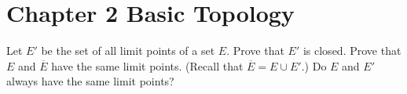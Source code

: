 \documentclass[12pt]{article}
\newenvironment{problem}[2][Exercise]{\begin{trivlist}
\item[\hskip \labelsep {\bfseries #1}\hskip \labelsep {\bfseries #2.}]}{\end{trivlist}}
\begin{document}

\rhead{\today}



\section*{Chapter 2 Basic Topology}


\begin{problem}{2.6}
Let $E'$ be the set of all limit points of a set $E$. Prove that $E'$ is closed. Prove that $E$ and $\overline{E}$ have the same limit points. (Recall that $\overline{E}=E\cup E'$.) Do $E$ and $E'$ always have the same limit points?
\end{problem}
\end{document}
